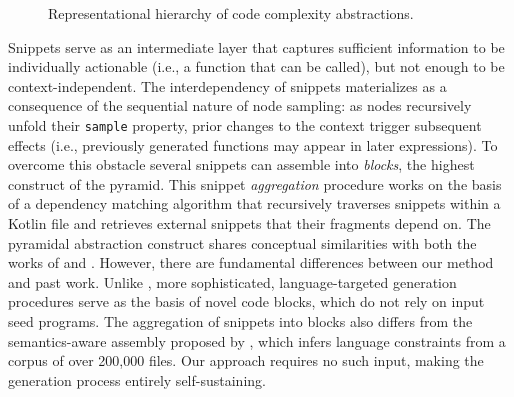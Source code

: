 \begin{figure}[htp]
\centering
{}

 \caption{Representational hierarchy of code complexity abstractions.}
 \label{fig:code-hierarchy}
\end{figure}

Snippets serve as an intermediate layer that captures sufficient information to be individually actionable (i.e., a function that can be called), but not enough to be
context-independent.
The interdependency of snippets materializes as a consequence of
the sequential nature of node sampling: as nodes recursively unfold
their \texttt{sample} property, prior changes to the context
trigger subsequent effects (i.e., previously generated 
functions may appear in later expressions).
To overcome this obstacle several snippets can assemble into \textit{blocks},
the highest construct of the pyramid.
This snippet \textit{aggregation} procedure works on the basis of a dependency matching
algorithm that recursively traverses snippets within a Kotlin file and retrieves
external snippets that their fragments depend on.
The pyramidal abstraction construct shares conceptual similarities with both
the works of \citet{holler2012fuzzing} and \citet{han2019codealchemist}.
However, there are fundamental differences between our method and past work.
Unlike \citet{holler2012fuzzing}, more sophisticated, language-targeted
generation procedures serve as the basis of novel code blocks, which do not
rely on input seed programs.
The aggregation of snippets into blocks also differs from the semantics-aware
assembly proposed by \citet{han2019codealchemist}, which infers language constraints
from a corpus of over 200,000 files.
Our approach requires no such input, making the generation process entirely self-sustaining. 

